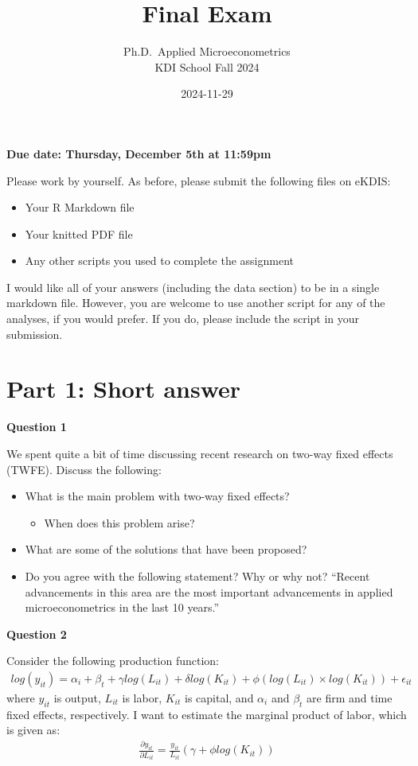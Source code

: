 \documentclass[
]{article}
\title{Final Exam}
\subtitle{Ph.D.~Applied Microeconometrics\\
KDI School Fall 2024}
\author{}
\date{\vspace{-2.5em}2024-11-29}
\providecommand{\tightlist}{%
  \setlength{\itemsep}{0pt}\setlength{\parskip}{0pt}}
\begin{document}
\maketitle

\textbf{Due date: Thursday, December 5th at 11:59pm}

Please work by yourself. As before, please submit the following files on eKDIS:

\begin{itemize}
\tightlist
\item
  Your R Markdown file
\item
  Your knitted PDF file
\item
  Any other scripts you used to complete the assignment
\end{itemize}

I would like all of your answers (including the data section) to be in a single markdown file. However, you are welcome to use another script for any of the analyses, if you would prefer. If you do, please include the script in your submission.

\section{Part 1: Short answer}\label{part-1-short-answer}

\textbf{Question 1}

We spent quite a bit of time discussing recent research on two-way fixed effects (TWFE). Discuss the following:

\begin{itemize}
\tightlist
\item
  What is the main problem with two-way fixed effects?

  \begin{itemize}
  \tightlist
  \item
    When does this problem arise?
  \end{itemize}
\item
  What are some of the solutions that have been proposed?
\item
  Do you agree with the following statement? Why or why not? ``Recent advancements in this area are the most important advancements in applied microeconometrics in the last 10 years.''
\end{itemize}

\textbf{Question 2}

Consider the following production function:
\begin{gather} \label{eq:prod} log(y_{it}) = \alpha_i + \beta_t + \gamma log(L_{it}) + \delta log(K_{it}) + \phi\left(log(L_{it})\times log(K_{it})\right) + \epsilon_{it} \end{gather}
where \(y_{it}\) is output, \(L_{it}\) is labor, \(K_{it}\) is capital, and \(\alpha_i\) and \(\beta_t\) are firm and time fixed effects, respectively. I want to estimate the marginal product of labor, which is given as:
\begin{gather} \label{eq:mp} \frac{\partial y_{it}}{\partial L_{it}} = \frac{y_{it}}{L_{it}}\left(\gamma + \phi log(K_{it})\right) \end{gather}
\end{document}
